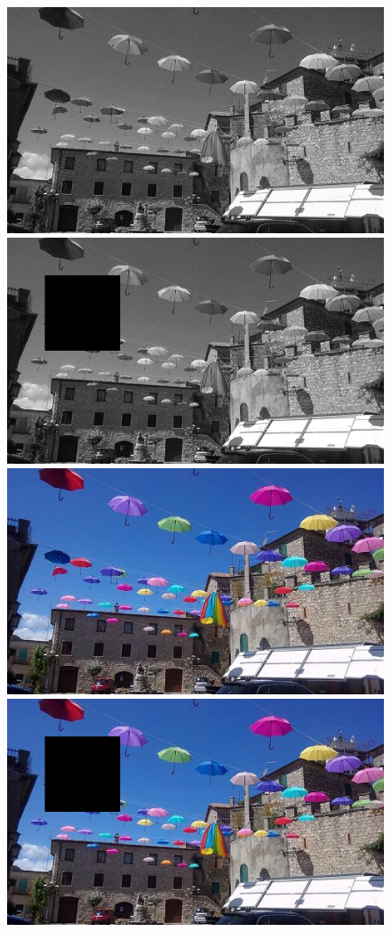 \documentclass{article}
\begin{document}
	\begin{figure}[!ht]	
	\centering	
	\includegraphics{img/gray-obraz1}	
	\includegraphics{img/geometryczne/wycinanie-gray}
	\includegraphics{img/rgb-obraz1}	
	\includegraphics{img/geometryczne/wycinanie-rgb}

\end{figure}
\end{document}
